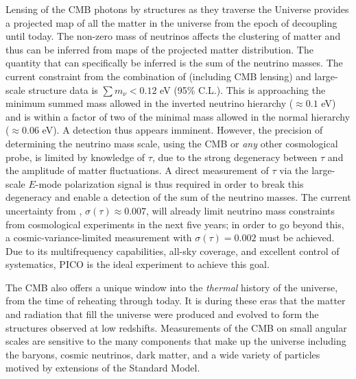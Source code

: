 \documentclass[PICOReport.tex]{subfiles}
\begin{document}
Lensing of the CMB photons by structures as they traverse the Universe provides a projected map of all the matter 
in the universe from the epoch of decoupling until today.  The non-zero mass of neutrinos affects the clustering of 
matter and thus can be inferred from maps of the projected matter distribution. The quantity that can specifically be 
inferred is the sum of the neutrino masses.  The current constraint from the combination of \planck (including CMB lensing) and large-scale structure data is $\sum m_{\nu} < 0.12$ eV (95\% C.L.).  This is approaching the minimum summed mass allowed in the inverted neutrino hierarchy ($\approx 0.1$ eV) and is within a factor of two of the minimal mass allowed in the normal hierarchy ($\approx 0.06$ eV).  A detection thus appears imminent.  %
However, the precision of determining the neutrino mass scale, using the CMB or {\it any} other cosmological probe, is limited by knowledge of $\tau$, due to the strong degeneracy between $\tau$ and the amplitude of matter fluctuations.  %
A direct measurement of $\tau$ via the large-scale $E$-mode polarization signal is thus required in order to break this degeneracy and enable a detection of the sum of the neutrino masses.  The current uncertainty from \planck, $\sigma(\tau) \approx 0.007$, will already limit neutrino mass constraints from cosmological experiments in the next five years; in order to go beyond this, a 
cosmic-variance-limited measurement with $\sigma(\tau) = 0.002$ must be achieved.  Due to its multifrequency capabilities, all-sky coverage, and excellent control of systematics, PICO is the ideal experiment to achieve this goal.



The CMB also offers a unique window into the {\it thermal} history of the universe, from the time of reheating through today.  
It is during these eras that the matter and radiation that fill the universe were produced and evolved to form the structures 
observed at low redshifts.  Measurements of the CMB on small angular scales are sensitive to the many components 
that make up the universe including the baryons, cosmic neutrinos, dark matter, and a wide variety of particles 
motived by extensions of the Standard Model.  
\end{document}
